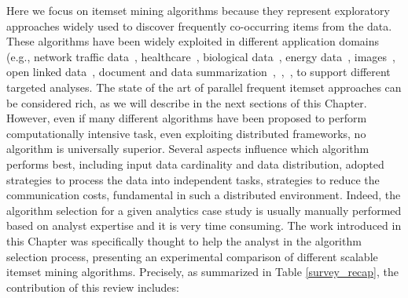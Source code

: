 Here we focus on itemset mining algorithms because they
represent exploratory approaches widely used to discover frequently co-occurring
items from the data. These algorithms have been widely exploited in different
application domains (e.g., network traffic data~\cite{ISPA13},
healthcare~\cite{META-TIST-2015}, biological data~\cite{DBLP:conf/sigmod/CongXPTY04}, energy
data~\cite{NostroENDM2016_senzacrossref}, images~\cite{zaianeimage},  open
linked data~\cite{BCOpenLinkedData}, document and data summarization~\cite{BaralisCFG15},~\cite{DBLP:journals/cg/LopesPPM07},~\cite{Mampaey:2011:TMI:2020408.2020499},
to support different targeted analyses.
The state of the art of parallel frequent itemset approaches can be considered rich, as we will describe in the next sections of this Chapter. However, even if many different algorithms have been proposed to perform computationally
intensive task, even exploiting distributed frameworks, no
algorithm is universally superior. 
Several aspects influence which algorithm
performs best, including input data cardinality and data distribution, adopted
strategies to process the data into independent tasks, strategies to reduce the
communication costs, fundamental in such a distributed environment. 
Indeed, the algorithm selection for a given analytics case study is
usually manually performed based on analyst expertise and it is very time
consuming. 
The work introduced in this Chapter was specifically thought to help the analyst in the algorithm selection process, presenting
an experimental comparison of different scalable itemset mining
algorithms. Precisely, as summarized in Table \ref{survey_recap}, the
contribution of this review includes:
